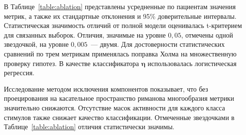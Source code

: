 В Таблице~\ref{table:ablation} представлены усредненные по пациентам значения метрик, а также их стандартные отклонения и 95\% доверительные интервалы. Статистическая значимость отличий от полной модели оценивалась t-критерием для связанных выборок. Отличия, значимые на уровне $0{,}05$, отмечены одной звездочкой, на уровне $0{,}005$~--- двумя. Для достоверности статистических сравнений по трем метрикам применялась поправка Холма на множественную проверку гипотез. В качестве классификатора $ \boldsymbol{\eta}$ использовалась логистическая регрессия.

\begin{table}[h!]
    \centering
    \caption{Влияние отдельных компонентов модели на качество классификации, оцененное методом исключения компонентов. Метрики на тестовых выборках усреднены по пациентам. Одной звездочкой отмечены отличия от полной модели, значимые на уровне $0{,}05$, двумя~--- на уровне $0{,}005$. Приведены 95\% доверительные интервалы}\label{table:ablation}
\end{table}

Исследование методом исключения компонентов показывает, что без проецирования на касательное пространство риманова многообразия метрики значительно снижаются. Отсутствие масок активности для каждого класса стимулов также снижает качество классификации. Отмеченные звездочками в Таблице~\ref{table:ablation} отличия статистически значимы.

